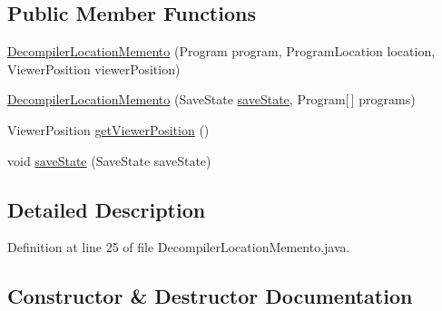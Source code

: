 \subsection*{Public Member Functions}
\begin{DoxyCompactItemize}
\item 
\mbox{\hyperlink{classghidra_1_1app_1_1plugin_1_1core_1_1decompile_1_1_decompiler_location_memento_ae2f74b1081d64d0b9056edaff6d83be6}{Decompiler\+Location\+Memento}} (Program program, Program\+Location location, Viewer\+Position viewer\+Position)
\item 
\mbox{\hyperlink{classghidra_1_1app_1_1plugin_1_1core_1_1decompile_1_1_decompiler_location_memento_aee736638d1946c497944955f90577efb}{Decompiler\+Location\+Memento}} (Save\+State \mbox{\hyperlink{classghidra_1_1app_1_1plugin_1_1core_1_1decompile_1_1_decompiler_location_memento_a434fa0a24811e2d0b021a1f909ea9595}{save\+State}}, Program\mbox{[}$\,$\mbox{]} programs)
\item 
Viewer\+Position \mbox{\hyperlink{classghidra_1_1app_1_1plugin_1_1core_1_1decompile_1_1_decompiler_location_memento_af8a3b0a5ae9e837634f352233b0d56e9}{get\+Viewer\+Position}} ()
\item 
void \mbox{\hyperlink{classghidra_1_1app_1_1plugin_1_1core_1_1decompile_1_1_decompiler_location_memento_a434fa0a24811e2d0b021a1f909ea9595}{save\+State}} (Save\+State save\+State)
\end{DoxyCompactItemize}


\subsection{Detailed Description}


Definition at line 25 of file Decompiler\+Location\+Memento.\+java.



\subsection{Constructor \& Destructor Documentation}
\mbox{\label{classghidra_1_1app_1_1plugin_1_1core_1_1decompile_1_1_decompiler_location_memento_ae2f74b1081d64d0b9056edaff6d83be6}} 
